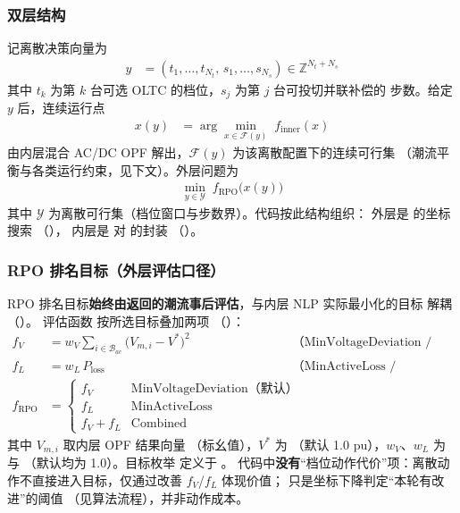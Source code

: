 \subsubsection*{双层结构}
记离散决策向量为
\begin{align*}
y &= (t_1,\ldots,t_{N_t},\,s_1,\ldots,s_{N_s})\in\mathbb{Z}^{N_t+N_s}
\end{align*}
其中 $t_k$ 为第 $k$ 台可选 OLTC 的档位，$s_j$ 为第 $j$ 台可投切并联补偿的
步数。给定 $y$ 后，连续运行点
\begin{align*}
x(y) &= \arg\min_{x\in\mathcal{F}(y)}\; f_{\mathrm{inner}}(x)
\end{align*}
由内层混合 AC/DC OPF 解出，$\mathcal{F}(y)$ 为该离散配置下的连续可行集
（潮流平衡与各类运行约束，见下文）。外层问题为
\begin{align*}
\min_{y\in\mathcal{Y}}\; f_{\mathrm{RPO}}\bigl(x(y)\bigr)
\end{align*}
其中 $\mathcal{Y}$ 为离散可行集（档位窗口与步数界）。代码按此结构组织：
外层是  的坐标搜索
（），
内层是  对  的封装
（）。

\subsubsection*{RPO 排名目标（外层评估口径）}
RPO 排名目标\textbf{始终由返回的潮流事后评估}，与内层 NLP 实际最小化的目标
解耦（）。
评估函数  按所选目标叠加两项
（）：
\begin{align*}
f_V &= w_V\sum_{i\in\mathcal{B}_{ac}} \bigl(V_{m,i}-V^{*}\bigr)^{2}
   && \text{（MinVoltageDeviation / Combined）}\\
f_L &= w_L\,P_{\mathrm{loss}}
   && \text{（MinActiveLoss / Combined）}\\
f_{\mathrm{RPO}} &=
   \begin{cases}
     f_V & \text{MinVoltageDeviation（默认）}\\
     f_L & \text{MinActiveLoss}\\
     f_V + f_L & \text{Combined}
   \end{cases}
\end{align*}
其中 $V_{m,i}$ 取内层 OPF 结果向量 （标幺值），$V^{*}$ 为
（默认 1.0 pu），$w_V$、$w_L$ 为  与
（默认均为 1.0）。目标枚举  定义于
。
代码中\textbf{没有}“档位动作代价”项：离散动作不直接进入目标，仅通过改善
$f_V$/$f_L$ 体现价值； 只是坐标下降判定“本轮有改进”的阈值
（见算法流程），并非动作成本。

